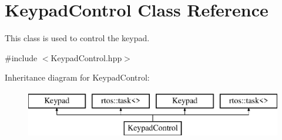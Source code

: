\hypertarget{class_keypad_control}{}\section{Keypad\+Control Class Reference}
\label{class_keypad_control}


This class is used to control the keypad.  




{\ttfamily \#include $<$Keypad\+Control.\+hpp$>$}

Inheritance diagram for Keypad\+Control\+:\begin{figure}[H]
\begin{center}
\leavevmode
\includegraphics[height=2.000000cm]{class_keypad_control}
\end{center}
\end{figure}
